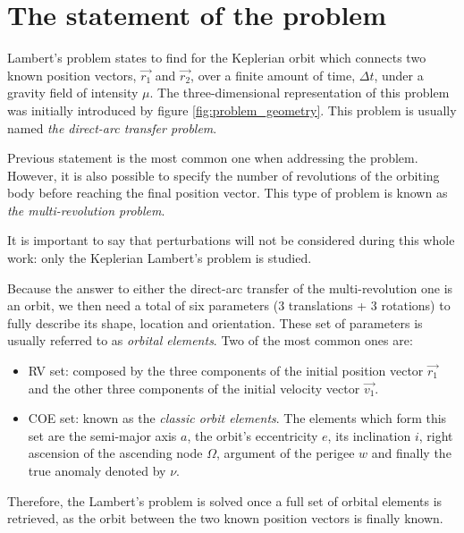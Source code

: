 \section{The statement of the problem}
\label{sec:statement}

Lambert's problem states to find for the Keplerian orbit which connects two
known position vectors, $\vec{r_{1}}$ and $\vec{r_{2}}$, over a finite amount of
time, $\Delta t$, under a gravity field of intensity $\mu$. The
three-dimensional representation of this problem was initially introduced by
figure \ref{fig:problem_geometry}. This problem is usually named \textit{the
  direct-arc transfer problem}.

Previous statement is the most common one when addressing the problem. However,
it is also possible to specify the number of revolutions of the orbiting body
before reaching the final position vector. This type of problem is known as
\textit{the multi-revolution problem}.

It is important to say that perturbations will not be considered during this
whole work: only the Keplerian Lambert's problem is studied.

Because the answer to either the direct-arc transfer of the multi-revolution one
is an orbit, we then need a total of six parameters (3 translations + 3
rotations) to fully describe its shape, location and orientation. These set of
parameters is usually referred to as \textit{orbital elements}. Two of the most
common ones are:

\begin{itemize}
  \item RV set: composed by the three components of the initial position
        vector $\vec{r_{1}}$ and the other three components of the
        initial velocity vector $\vec{v_{1}}$.
  \item COE set: known as the \textit{classic orbit elements}. The
        elements which form this set are the semi-major axis $a$, the
        orbit's eccentricity $e$, its inclination $i$, right ascension
        of the ascending node $\Omega$, argument of the perigee $w$ and
        finally the true anomaly denoted by $\nu$.
\end{itemize}

Therefore, the Lambert's problem is solved once a full set of orbital elements
is retrieved, as the orbit between the two known position vectors is finally
known.
